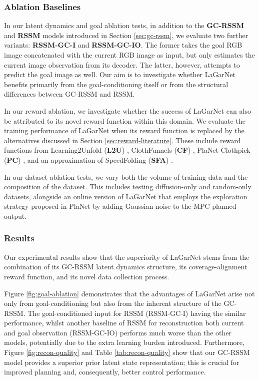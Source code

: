 \documentclass[journal]{IEEEtran}
\begin{document}
\subsubsection{Ablation Baselines}


In our latent dynamics and goal ablation tests, in addition to the \textbf{GC-RSSM} and \textbf{RSSM} models introduced in Section \ref{sec:gc-rssm}, we evaluate two further variants: \textbf{RSSM-GC-I} and \textbf{RSSM-GC-IO}. The former takes the goal RGB image concatenated with the current RGB image as input, but only estimates the current image observation from its decoder. The latter, however, attempts to predict the goal image as well. Our aim is to investigate whether LaGarNet benefits primarily from the goal-conditioning itself or from the structural differences between GC-RSSM and RSSM.

In our reward ablation, we investigate whether the success of LaGarNet can also be attributed to its novel reward function within this domain. We evaluate the training performance of LaGarNet when its reward function is replaced by the alternatives discussed in Section \ref{sec:reward-literature}. These include reward functions from Learning2Unfold (\textbf{L2U}) \cite{gu2023learning}, ClothFunnels (\textbf{CF}) \cite{canberk2023cloth}, PlaNet-Clothpick (\textbf{PC}) \cite{kadi2024planet}, and an approximation of SpeedFolding (\textbf{SFA}) \cite{avigal2022speedfolding}.

In our dataset ablation tests, we vary both the volume of training data and the composition of the dataset. This includes testing diffusion-only and random-only datasets, alongside an online version of LaGarNet that employs the exploration strategy proposed in PlaNet \cite{hafner2019learning} by adding Gaussian noise to the MPC planned output.
 
\subsubsection{Results}

Our experimental results show that the superiority of LaGarNet stems from the combination of its GC-RSSM latent dynamics structure, its coverage-alignment reward function, and its novel data collection process. 

Figure \ref{fig:goal-ablation} demonstrates that the advantages of LaGarNet arise not only from goal-conditioning but also from the inherent structure of the GC-RSSM. The goal-conditioned input for RSSM (RSSM-GC-I) having the similar performance, whilst another baseline of RSSM for reconstruction both current and goal observation (RSSM-GC-IO) performs much worse than the other models, potentially due to the extra learning burden introduced. Furthermore, Figure \ref{fig:recon-quality} and Table \ref{tab:recon-quality} show that our GC-RSSM model provides a superior prior latent state representation; this is crucial for improved planning and, consequently, better control performance.
\end{document}
